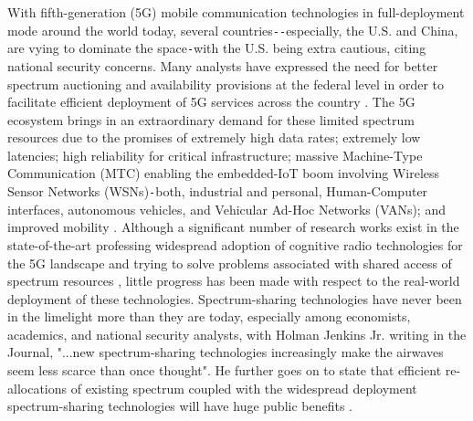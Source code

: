 With fifth-generation (5G) mobile communication technologies in full-deployment mode around the world today, several countries\texttt{-{}-}especially, the U.S. and China, are vying to dominate the space\texttt{-}with the U.S. being extra cautious, citing national security concerns. Many analysts have expressed the need for better spectrum auctioning and availability provisions at the federal level in order to facilitate efficient deployment of 5G services across the country \cite{WSJ:5Gdominance}. The 5G ecosystem brings in an extraordinary demand for these limited spectrum resources due to the promises of extremely high data rates; extremely low latencies; high reliability for critical infrastructure; massive Machine-Type Communication (MTC) enabling the embedded-IoT boom involving Wireless Sensor Networks (WSNs)\texttt{-}both, industrial and personal, Human-Computer interfaces, autonomous vehicles, and Vehicular Ad-Hoc Networks (VANs); and improved mobility \cite{WCL:1,Ericsson:5Gusecases}. Although a significant number of research works exist in the state-of-the-art professing widespread adoption of cognitive radio technologies for the 5G landscape and trying to solve problems associated with shared access of spectrum resources \cite{WCL:7,WCL:6,WCL:4,WCL:5,WCL:9,WCL:10,WCL:11}, little progress has been made with respect to the real-world deployment of these technologies. Spectrum-sharing technologies have never been in the limelight more than they are today, especially among economists, academics, and national security analysts, with Holman Jenkins Jr. writing in the Journal, "...new spectrum-sharing technologies increasingly make the airwaves seem less scarce than once thought". He further goes on to state that efficient re-allocations of existing spectrum coupled with the widespread deployment spectrum-sharing technologies will have huge public benefits \cite{WSJ:HolmanJenkinsJr.}.


